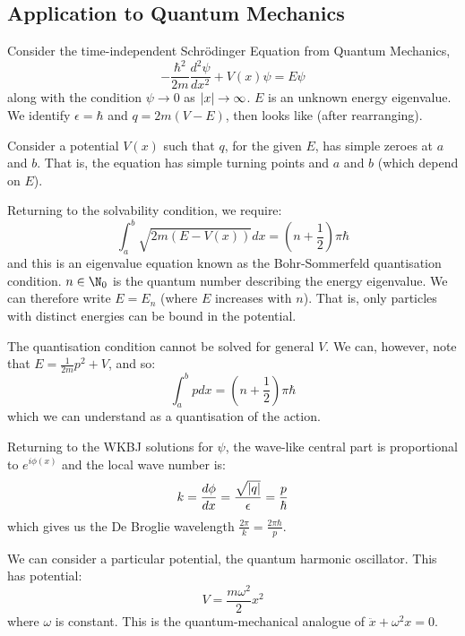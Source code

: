 \documentclass[../Main.tex]{subfiles}
\begin{document}
\subsection{Application to Quantum Mechanics}
Consider the time-independent Schr\"odinger Equation from Quantum Mechanics,
\begin{equation}
    -\frac{\hbar^2}{2m} \frac{d^{2}\psi}{dx^{2}} + V(x) \psi = E\psi
    \label{eqnSchrodinger}
\end{equation}
along with the condition $\psi \to 0$ as $\left|x\right| \to \infty$. $E$ is an unknown energy eigenvalue. We identify $\epsilon = \hbar$ and $q = 2m(V - E)$, then  looks like  (after rearranging).

Consider a potential $V(x)$ such that $q$, for the given $E$, has simple zeroes at $a$ and $b$. That is, the equation has simple turning points and $a$ and $b$ (which depend on $E$).

Returning to the solvability condition, we require:
\begin{equation*}
    \int_{a}^{b} \sqrt{2m\left(E - V(x)\right)} dx = \left(n + \frac12\right) \pi\hbar
\end{equation*}
and this is an eigenvalue equation known as the Bohr-Sommerfeld quantisation condition. $n \in \N_0$ is the quantum number describing the energy eigenvalue. We can therefore write $E = E_n$ (where $E$ increases with $n$). That is, only particles with distinct energies can be bound in the potential.

The quantisation condition cannot be solved for general $V$. We can, however, note that $E = \frac1{2m} p^2 + V$, and so:
\begin{equation*}
    \int_{a}^{b} p dx = \left(n + \frac12\right)\pi\hbar
\end{equation*}
which we can understand as a quantisation of the action.

Returning to the WKBJ solutions for $\psi$, the wave-like central part is proportional to $e^{i\phi(x)}$ and the local wave number is:
\begin{equation*}
    k = \frac{d\phi}{dx} = \frac{\sqrt{\left|q\right|}}{\epsilon} = \frac{p}{\hbar}
\end{equation*}
which gives us the De Broglie wavelength $\frac{2\pi}{k} = \frac{2\pi\hbar}{p}$.

We can consider a particular potential, the quantum harmonic oscillator. This has potential:
\begin{equation*}
    V = \frac{m \omega^2}{2} x^2
\end{equation*}
where $\omega$ is constant. This is the quantum-mechanical analogue of $\ddot{x} + \omega^2 x = 0$.
\end{document}
